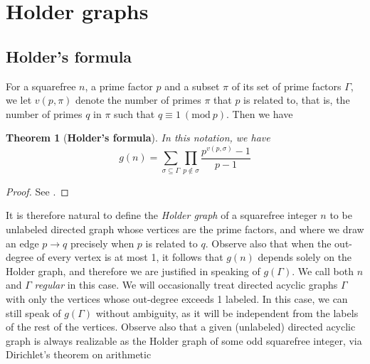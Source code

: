 \documentclass[draft]{article}
\newcommand{\Mod}[1]{\ (\mathrm{mod} \ #1)}
\theoremstyle{plain}
\newtheorem{fact}{Theorem}[section]
\theoremstyle{definition}
\begin{document}
\section{Holder graphs}
\subsection{Holder's formula}
For a squarefree $n$, a prime factor $p$ and a subset $\pi$ of its set of prime factors $\Gamma$, we let $v(p, \pi)$ denote the number of primes $\pi$ that $p$ is related to, that is, the number of primes $q$ in $\pi$ such that $q \equiv 1 \Mod{p}$. Then we have
\begin{fact}[\textbf{Holder's formula}] In this notation, we have
	\begin{equation*}
		g(n) = \sum_{\sigma \subseteq \Gamma} \prod_{p \notin \sigma} \frac{p^{v(p, \sigma)} - 1}{p - 1}
	\end{equation*}
\end{fact}
\begin{proof} See {\cite{gnumoas}}. \end{proof}

It is therefore natural to define the \emph{Holder graph} of a squarefree integer $n$ to be unlabeled directed graph whose vertices are the prime factors, and where we draw an edge $p \rightarrow q$ precisely when $p$ is related to $q$. Observe also that when the out-degree of every vertex is at most 1, it follows that $g(n)$ depends solely on the Holder graph, and therefore we are justified in speaking of $g(\Gamma).$ We call both $n$ and $\Gamma$ \emph{regular} in this case. We will occasionally treat directed acyclic graphs $\Gamma$ with only the vertices whose out-degree exceeds 1 labeled. In this case, we can still speak of $g(\Gamma)$ without ambiguity, as it will be independent from the labels of the rest of the vertices. Observe also that a given (unlabeled) directed acyclic graph is always realizable as the Holder graph of some odd squarefree integer, via Dirichlet's theorem on arithmetic
\end{document}
